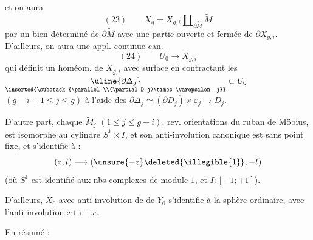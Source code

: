 
et on aura
\[
(23)\qquad X_g=X_{g,i}\amalg_{\partial\widetilde M}\widetilde M
\]
par un  bien déterminé de $\partial\widetilde M$ avec une partie ouverte et fermée de $\partial X_{g,i}$. D'ailleurs, on aura une appl. continue can.
\[
(24)\qquad U_0\longrightarrow X_{g,i}
\]
qui définit un homéom. de $X_{g,i}$ avec   surface  en contractant les $\underset{\inserted{\substack{\parallel\\(\partial D_j)\times\varepsilon_j}}}{\uline{\partial\Delta_j}}\subset U_0$ $(g-i+1\leq j\leq g)$ à l'aide des  $\partial\Delta_j\simeq(\partial D_j)\times\varepsilon_j\longrightarrow D_j$.

D'autre part, chaque $\widetilde M_j$ $(1\leq j\leq g-i)$, rev.  orientations du ruban de Möbius, est isomorphe au cylindre $S^1\times I$, et son anti-involution canonique  est sans point fixe, et s'identifie à :
\[
(z,t)\longrightarrow(\unsure{-z}\deleted{\illegible{1}},-t)
\]
(où $S^1$ est identifié aux nbs complexes de module $1$, et $I:[-1;+1]$).

D'ailleurs, $X_0$  avec  anti-involution de  de $Y_0$ s'identifie à la sphère  ordinaire, avec l'anti-involution $x\longmapsto-x$.


En résumé :


